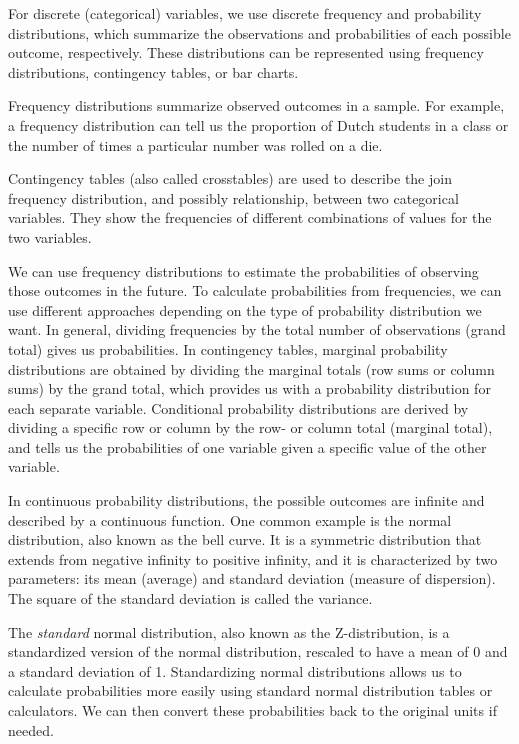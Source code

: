 \documentclass[
  letterpaper,
]{scrbook}
\begin{document}
For discrete (categorical) variables, we use discrete frequency and
probability distributions, which summarize the observations and
probabilities of each possible outcome, respectively. These
distributions can be represented using frequency distributions,
contingency tables, or bar charts.

Frequency distributions summarize observed outcomes in a sample. For
example, a frequency distribution can tell us the proportion of Dutch
students in a class or the number of times a particular number was
rolled on a die.

Contingency tables (also called crosstables) are used to describe the
join frequency distribution, and possibly relationship, between two
categorical variables. They show the frequencies of different
combinations of values for the two variables.

We can use frequency distributions to estimate the probabilities of
observing those outcomes in the future. To calculate probabilities from
frequencies, we can use different approaches depending on the type of
probability distribution we want. In general, dividing frequencies by
the total number of observations (grand total) gives us probabilities.
In contingency tables, marginal probability distributions are obtained
by dividing the marginal totals (row sums or column sums) by the grand
total, which provides us with a probability distribution for each
separate variable. Conditional probability distributions are derived by
dividing a specific row or column by the row- or column total (marginal
total), and tells us the probabilities of one variable given a specific
value of the other variable.

In continuous probability distributions, the possible outcomes are
infinite and described by a continuous function. One common example is
the normal distribution, also known as the bell curve. It is a symmetric
distribution that extends from negative infinity to positive infinity,
and it is characterized by two parameters: its mean (average) and
standard deviation (measure of dispersion). The square of the standard
deviation is called the variance.

The \emph{standard} normal distribution, also known as the
Z-distribution, is a standardized version of the normal distribution,
rescaled to have a mean of 0 and a standard deviation of 1.
Standardizing normal distributions allows us to calculate probabilities
more easily using standard normal distribution tables or calculators. We
can then convert these probabilities back to the original units if
needed.
\end{document}
